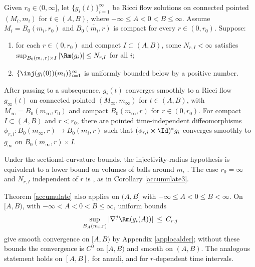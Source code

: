 \begin{theorem}
  \label{thm:kl-convergent-subsequences-ricci-flow-solutions-existence-convergent-subsequences-ricci-flow-solutions}
\label{accumulate}

Given $r_0\in(0,\infty]$, let $\{g_i(t)\}_{i=1}^\infty$ be Ricci flow
solutions on connected pointed $(M_i,m_i)$ for
$t\in(A,B)$, where $-\infty\leq A<0<B\leq\infty$. Assume
$M_i=B_0(m_i,r_0)$ and $\overline{B_0(m_i,r)}$ is compact for every
$r\in(0,r_0)$. Suppose:
\begin{enumerate}
\item for each $r\in(0,r_0)$ and compact $I\subset(A,B)$, some
$N_{r,I}<\infty$ satisfies
$\sup_{B_0(m_i,r)\times I}|\Rm(g_i)|\leq N_{r,I}$ for all $i$;
\item $\{\inj(g_i(0))(m_i)\}_{i=1}^\infty$ is uniformly bounded below by a
positive number.
\end{enumerate}
After passing to a subsequence, $g_i(t)$ converges smoothly to a Ricci flow
$g_\infty(t)$ on connected pointed $(M_\infty,m_\infty)$ for
$t\in(A,B)$, with $M_\infty=B_0(m_\infty,r_0)$ and compact
$\overline{B_0(m_\infty,r)}$ for $r\in(0,r_0)$. For compact
$I\subset(A,B)$ and $r<r_0$, there are pointed time-independent
diffeomorphisms $\phi_{r,i}:B_0(m_\infty,r)\rightarrow B_0(m_i,r)$ such that
$(\phi_{r,i}\times\Id)^*g_i$ converges smoothly to $g_\infty$ on
$B_0(m_\infty,r)\times I$.
\end{theorem}

Under the sectional-curvature bounds, the injectivity-radius hypothesis is
equivalent to a lower bound on volumes of balls around $m_i$
\cite[Theorem 4.7]{Cheeger-Gromov-Taylor}. The case $r_0=\infty$ and
$N_{r,I}$ independent of $r$ is \cite[Main Theorem]{Hamiltonnn}, as in
Corollary \ref{accumulate3}.

Theorem \ref{accumulate} also applies on $(A,B]$ with
$-\infty\leq A<0\leq B<\infty$. On $[A,B)$, with
$-\infty<A<0<B\leq\infty$, uniform bounds
\begin{equation}
\sup_{B_A(m_i,r)}|\nabla^j\Rm(g_i(A))|\: \le \:C_{r,j}
\end{equation}
give smooth convergence on $[A,B)$ by Appendix \ref{applocalder}; without
these bounds the convergence is $C^0$ on $[A,B)$ and smooth on $(A,B)$.
The analogous statement holds on $[A,B]$, for annuli, and for
$r$-dependent time intervals.

